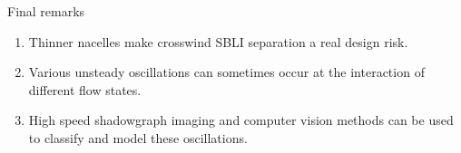 \begin{frame}{Final remarks}
  \begin{enumerate}\setlength\itemsep{1em}
    \item Thinner nacelles make crosswind SBLI separation a real design risk.
    \item Various unsteady oscillations can sometimes occur at the interaction of different flow states.
    \item High speed shadowgraph imaging and computer vision methods can be used to classify and model these oscillations.
  \end{enumerate}
\end{frame}


